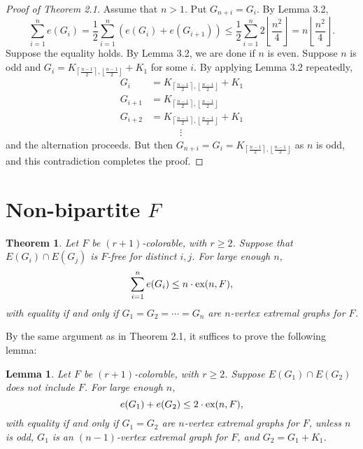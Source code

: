 \documentclass[12pt]{report}
\newtheorem{theorem}{Theorem}[chapter]
\newtheorem{lemma}{Lemma}[theorem]
\begin{document}
\begin{proof}[Proof of Theorem 2.1]
  Assume that $n > 1$. Put $G_{n + i} = G_i$. By Lemma 3.2,
  \[
    \sum_{i = 1}^n e(G_i) = \frac{1}{2}\sum_{i = 1}^n (e(G_i) + e(G_{i + 1})) \leq \frac{1}{2}\sum_{i = 1}^n 2\left\lfloor\frac{n^2}{4}\right\rfloor = n\left\lfloor\frac{n^2}{4}\right\rfloor.
  \]
  Suppose the equality holds. By Lemma 3.2, we are done if $n$ is even. Suppose $n$ is odd and $G_i
   = K_{\left\lceil\frac{n - 1}{2}\right\rceil, \left\lfloor\frac{n - 1}{2}\right\rfloor} + K_1$ for
   some $i$. By applying Lemma 3.2 repeatedly, 
   \begin{align*}
    G_i &= K_{\left\lceil\frac{n - 1}{2}\right\rceil, \left\lfloor\frac{n - 1}{2}\right\rfloor} + K_1 \\
    G_{i + 1} &= K_{\left\lceil\frac{n - 1}{2}\right\rceil, \left\lfloor\frac{n - 1}{2}\right\rfloor} \\
    G_{i + 2} &= K_{\left\lceil\frac{n - 1}{2}\right\rceil, \left\lfloor\frac{n - 1}{2}\right\rfloor} + K_1 \\
    &\qquad\quad \vdots
   \end{align*}
   and the alternation proceeds. But then $G_{n + i} = G_i =
   K_{\left\lceil\frac{n - 1}{2}\right\rceil, \left\lfloor\frac{n - 1}{2}\right\rfloor}$ as $n$ is
   odd, and this contradiction completes the proof.
\end{proof}

\section{Non-bipartite $F$}

\begin{theorem}
  Let $F$ be $(r + 1)$-colorable, with $r \geq 2$. Suppose that $E(G_i) \cap E(G_j)$ is $F$-free for
  distinct $i, j$. For large enough $n$,
  \[
    \sum_{i = 1}^n e(G_i) \leq n \cdot \textnormal{ex}(n, F),
  \]
  with equality if and only if $G_1 = G_2 = \cdots = G_n$ are $n$-vertex extremal graphs for $F$.
\end{theorem}

By the same argument as in Theorem 2.1, it suffices to prove the following lemma:

\begin{lemma}
  Let $F$ be $(r + 1)$-colorable, with $r \geq 2$. Suppose $E(G_1) \cap E(G_2)$ does not include
  $F$. For large enough $n$,
  \[
    e(G_1) + e(G_2) \leq 2 \cdot \textnormal{ex}(n, F),
  \]
  with equality if and only if $G_1 = G_2$ are $n$-vertex extremal graphs for $F$, unless $n$ is
  odd, $G_1$ is an $(n - 1)$-vertex extremal graph for $F$, and $G_2 = G_1 + K_1$. 
\end{lemma}
\end{document}
